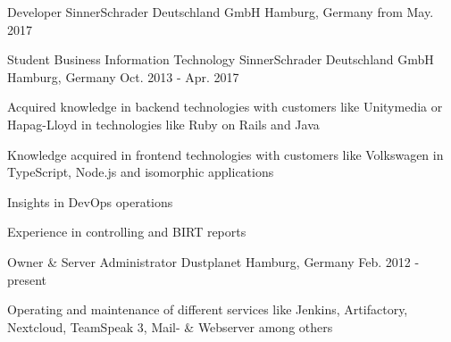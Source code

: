 

\begin{cventries}

  \cventry
    {Developer} %
    {SinnerSchrader Deutschland GmbH} %
    {Hamburg, Germany} %
    {from May. 2017} %
    {
    }

  \cventry
    {Student Business Information Technology} %
    {SinnerSchrader Deutschland GmbH} %
    {Hamburg, Germany} %
    {Oct. 2013 - Apr. 2017} %
    {
      \begin{cvitems} %
        \item {Acquired knowledge in backend technologies with customers like Unitymedia or Hapag-Lloyd in technologies like Ruby on Rails and Java}
        \item {Knowledge acquired in frontend technologies with customers like Volkswagen in TypeScript, Node.js and isomorphic applications}
        \item {Insights in DevOps operations}
        \item {Experience in controlling and BIRT reports}
      \end{cvitems}
    }

  \cventry
    {Owner \& Server Administrator} %
    {Dustplanet} %
    {Hamburg, Germany} %
    {Feb. 2012 - present} %
    {
      \begin{cvitems} %
      	\item {Operating and maintenance of different services like Jenkins, Artifactory, Nextcloud, TeamSpeak 3, Mail- \& Webserver among others}
      \end{cvitems}
    }

\end{cventries}
